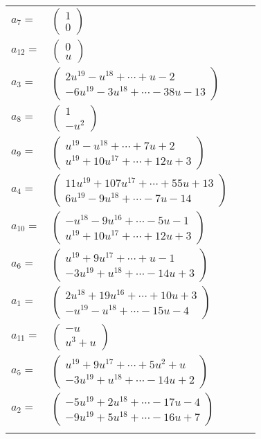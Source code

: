 \documentclass[1p]{elsarticle_modified}
\theoremstyle{definition}
\begin{document}
\begin{tabular}{m{7pt} m{180pt} m{7pt} m{180pt} }
\flushright $a_{7}=$&$\begin{pmatrix}1\\0\end{pmatrix}$ \\
\flushright $a_{12}=$&$\begin{pmatrix}0\\u\end{pmatrix}$ \\
\flushright $a_{3}=$&$\begin{pmatrix}2 u^{19}- u^{18}+\cdots+u-2\\-6 u^{19}-3 u^{18}+\cdots-38 u-13\end{pmatrix}$ \\
\flushright $a_{8}=$&$\begin{pmatrix}1\\- u^2\end{pmatrix}$ \\
\flushright $a_{9}=$&$\begin{pmatrix}u^{19}- u^{18}+\cdots+7 u+2\\u^{19}+10 u^{17}+\cdots+12 u+3\end{pmatrix}$ \\
\flushright $a_{4}=$&$\begin{pmatrix}11 u^{19}+107 u^{17}+\cdots+55 u+13\\6 u^{19}-9 u^{18}+\cdots-7 u-14\end{pmatrix}$ \\
\flushright $a_{10}=$&$\begin{pmatrix}- u^{18}-9 u^{16}+\cdots-5 u-1\\u^{19}+10 u^{17}+\cdots+12 u+3\end{pmatrix}$ \\
\flushright $a_{6}=$&$\begin{pmatrix}u^{19}+9 u^{17}+\cdots+u-1\\-3 u^{19}+u^{18}+\cdots-14 u+3\end{pmatrix}$ \\
\flushright $a_{1}=$&$\begin{pmatrix}2 u^{18}+19 u^{16}+\cdots+10 u+3\\- u^{19}- u^{18}+\cdots-15 u-4\end{pmatrix}$ \\
\flushright $a_{11}=$&$\begin{pmatrix}- u\\u^3+u\end{pmatrix}$ \\
\flushright $a_{5}=$&$\begin{pmatrix}u^{19}+9 u^{17}+\cdots+5 u^2+u\\-3 u^{19}+u^{18}+\cdots-14 u+2\end{pmatrix}$ \\
\flushright $a_{2}=$&$\begin{pmatrix}-5 u^{19}+2 u^{18}+\cdots-17 u-4\\-9 u^{19}+5 u^{18}+\cdots-16 u+7\end{pmatrix}$\\&\end{tabular}
\end{document}
